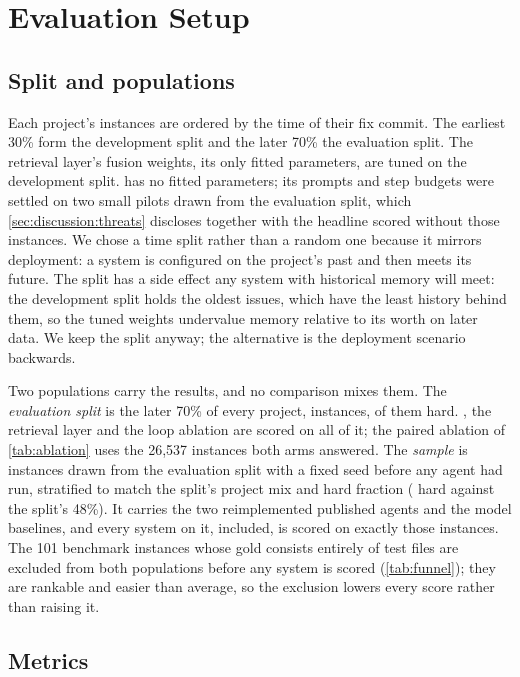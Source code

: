 \section{Evaluation Setup}
\label{sec:setup}

\subsection{Split and populations}
\label{sec:setup:protocol}
\label{sec:setup:populations}

Each project's instances are ordered by the time of their fix commit.
The earliest 30\% form the development split and the later 70\% the
evaluation split. The retrieval layer's fusion weights, its only fitted
parameters, are tuned on the development split. \sys{} has no fitted
parameters; its prompts and step budgets were settled on two small
pilots drawn from the evaluation split, which
\cref{sec:discussion:threats} discloses together with the headline
scored without those instances. We chose a time split rather than a
random one
because it mirrors deployment: a system is configured on the project's
past and then meets its future. The split has a side effect any system
with historical memory will meet: the development split holds the
oldest issues, which have the least history behind them, so the tuned
weights undervalue memory relative to its worth on later data. We keep
the split anyway; the alternative is the deployment scenario backwards.

Two populations carry the results, and no comparison mixes them. The
\emph{evaluation split} is the later 70\% of every project,
\nEval{} instances, \nEvalHard{} of them hard. \sys{}, the retrieval
layer and the loop ablation are scored on all of it; the paired
ablation of \cref{tab:ablation} uses the 26{,}537 instances both arms
answered. The
\emph{sample} is \nSample{} instances drawn from the evaluation split
with a fixed seed before any agent had run, stratified to match the
split's project mix and hard fraction (\nSampleHard{} hard against the
split's 48\%). It carries the two reimplemented published agents and
the model baselines, and every system on it, \sys{} included, is scored
on exactly those instances. The 101 benchmark instances whose gold consists entirely of
test files are excluded from both populations before any system is
scored (\cref{tab:funnel}); they are rankable and easier than average,
so the exclusion lowers every score rather than raising it.

\subsection{Metrics}
\label{sec:setup:metrics}

